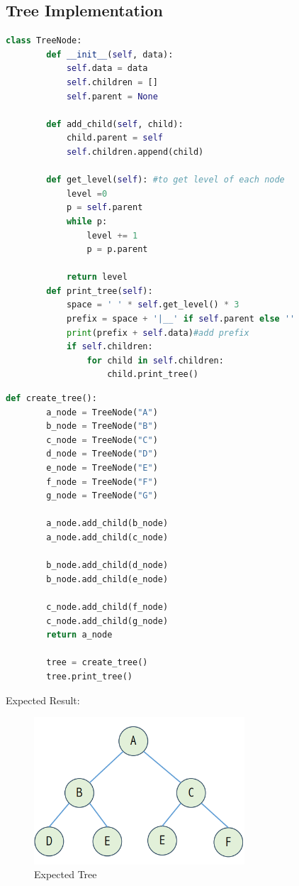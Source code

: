 \subsection{Tree Implementation}
\begin{lstlisting}[language=python, caption={Defining Tree Node}]
	class TreeNode:
		def __init__(self, data):
			self.data = data
			self.children = []
			self.parent = None
	
		def add_child(self, child):
			child.parent = self
			self.children.append(child)
	
		def get_level(self): #to get level of each node
			level =0
			p = self.parent
			while p:
				level += 1
				p = p.parent
	
			return level
		def print_tree(self):
			space = ' ' * self.get_level() * 3
			prefix = space + '|__' if self.parent else ''
			print(prefix + self.data)#add prefix
			if self.children:
				for child in self.children:
					child.print_tree()
\end{lstlisting}

\begin{lstlisting}[language=python, caption={Example of creating a Tree from Nodes}]
	def create_tree():
		a_node = TreeNode("A")
		b_node = TreeNode("B")
		c_node = TreeNode("C")
		d_node = TreeNode("D")
		e_node = TreeNode("E")
		f_node = TreeNode("F")
		g_node = TreeNode("G")
	
		a_node.add_child(b_node)
		a_node.add_child(c_node)
		
		b_node.add_child(d_node)
		b_node.add_child(e_node)
	
		c_node.add_child(f_node)
		c_node.add_child(g_node)
		return a_node
		
		tree = create_tree()
		tree.print_tree()
\end{lstlisting}

Expected Result:
\begin{figure}[H]
	\centering
	\includegraphics[width=0.7\textwidth]{figures/expected-tree}
	\caption{Expected Tree}
	\label{fig:expected-tree}
\end{figure}


